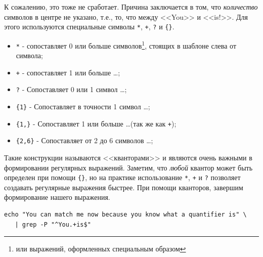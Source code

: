 \documentclass[12pt]{article}
\providecommand{\tightlist}{%
  \setlength{\itemsep}{0pt}\setlength{\parskip}{0pt}}
\begin{document}
К сожалению, это тоже не сработает. Причина заключается в том,
что \emph{количество} символов в центре не указано,
т.е., то, что между <<You>> и <<is!>>. Для этого используются специальные
символы \texttt{*}, \texttt{+}, \texttt{?} и \texttt{\{\}}.
\begin{itemize}
\tightlist
\item
  \texttt{*} - сопоставляет 0 или больше символов\footnote{или выражений, оформленных специальным образом}, стоящих в шаблоне
  слева от символа;
\item
  \texttt{+} - сопоставляет 1 или больше \ldots;
\item
  \texttt{?} - Сопоставляет 0 или 1 символ \ldots;
\item
  \texttt{\{1\}} - Сопоставляет в точности 1 символ \ldots;
\item
  \texttt{\{1,\}} - Сопоставляет 1 или больше \ldots (так же как
  \texttt{+});
\item
  \texttt{\{2,6\}} - Сопоставляет от 2 до 6 символов \ldots;
\end{itemize}

Такие конструкции называются <<кванторами>> и являются очень важными в
формировании регулярных выражений. Заметим, что \emph{любой} квантор
может быть определен при помощи \texttt{\{\}}, но на практике
использование \texttt{*}, \texttt{+} и \texttt{?} позволяет создавать
регулярные выражения быстрее. При помощи кванторов, завершим формирование
нашего выражения.
\begin{verbatim}
echo "You can match me now because you know what a quantifier is" \
   | grep -P "^You.+is$"
\end{verbatim}
\end{document}
